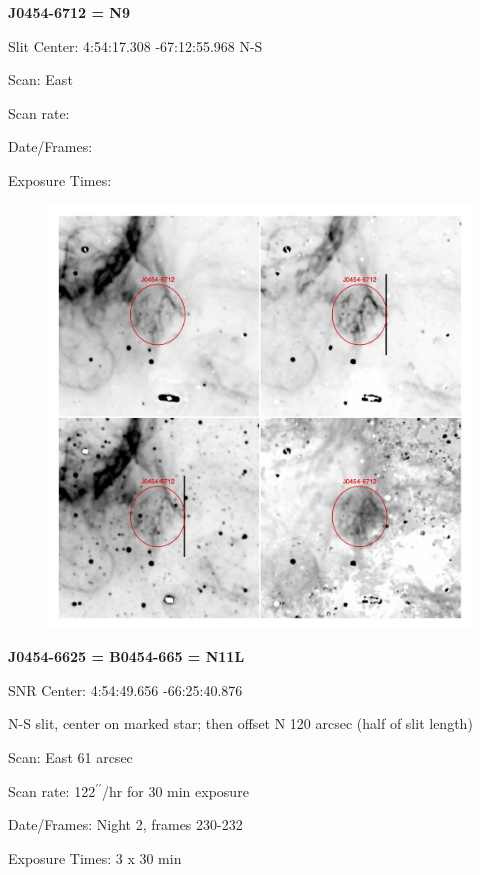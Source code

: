 \documentclass[11pt]{article}
\newcommand{\arcsec}{$^{\prime\prime}$}
\begin{document}
\newpage
{\bf J0454-6712 = N9}

Slit Center:   4:54:17.308    -67:12:55.968     N-S

Scan:  East

Scan rate:  

Date/Frames:

Exposure Times:  

\begin{figure}
\includegraphics[width=11.cm]{snapshots/J0454-6712.png}
\end{figure}

\newpage
{\bf J0454-6625 = B0454-665 = N11L}

SNR Center:   4:54:49.656   -66:25:40.876     

N-S slit, center on marked star; then offset N 120 arcsec (half of slit length)

Scan:  East  61 arcsec

Scan rate:  122\arcsec/hr for 30 min exposure

Date/Frames:  Night 2, frames 230-232

Exposure Times:  3 x 30 min
\end{document}
